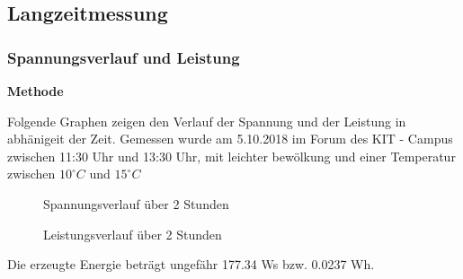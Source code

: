 \subsection {Langzeitmessung}                                       %
    \subsubsection{Spannungsverlauf und Leistung}                       %
        \textbf{Methode}
        \newline
        \par 
    
    
    
    
    
        Folgende Graphen zeigen den Verlauf der Spannung und der Leistung in abhänigeit der Zeit. Gemessen wurde am 5.10.2018 im Forum des KIT - Campus zwischen 11:30 Uhr und 13:30 Uhr, mit leichter bewölkung und einer Temperatur zwischen $10^{\circ}C$ und $15^{\circ}C$
        \begin{figure}[H]
            \def\svgwidth{\textwidth}
            
            
            \caption{Spannungsverlauf über 2 Stunden}
        \end{figure}

        \begin{figure}[H]
            \def\svgwidth{\textwidth}
            
            
            \caption{Leistungsverlauf über 2 Stunden}
        \end{figure}
        
        Die erzeugte Energie beträgt ungefähr 177.34 Ws bzw. 0.0237 Wh.

        
        
        
        
        
